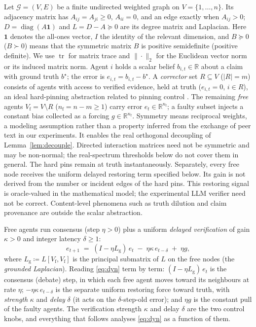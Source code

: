 \documentclass[11pt]{article}
\theoremstyle{definition}
\newcommand{\R}{\mathbb{R}}
\newcommand{\Lg}{L_{\mathrm g}}
\DeclareMathOperator{\diag}{diag}
\DeclareMathOperator{\tr}{tr}
\begin{document}
Let $\mathcal G=(V,E)$ be a finite undirected weighted graph on $V=\{1,\dots,n\}$.
Its adjacency matrix has $A_{ij}=A_{ji}\ge0$, $A_{ii}=0$, and an edge exactly when $A_{ij}>0$;
$D=\diag(A\mathbf1)$ and $L=D-A\succeq0$ are its degree matrix and Laplacian.
Here $\mathbf1$ denotes the all-ones vector, $I$ the identity of the relevant dimension,
and $B\succeq0$ ($B\succ0$) means that the symmetric matrix $B$ is positive semidefinite
(positive definite). We use $\tr$ for matrix trace and $\|\cdot\|_2$ for the Euclidean
vector norm or its induced matrix norm. Agent $i$
holds a scalar belief $b_{i,t}\in\R$ about a claim with ground truth $b^\star$; the error is
$e_{i,t}=b_{i,t}-b^\star$. A \emph{corrector} set $R\subseteq V$ ($|R|=m$) consists of agents with
access to verified evidence, held at truth ($e_{i,t}=0$, $i\in R$), an ideal hard-pinning abstraction related to pinning control
\cite{WangChen}. The remaining \emph{free} agents
$V_{\mathrm f}=V\setminus R$ ($n_{\mathrm f}=n-m\ge1$) carry error $e_t\in\R^{n_{\mathrm f}}$; a faulty
subset injects a constant bias collected as a forcing $g\in\R^{n_{\mathrm f}}$.
Symmetry means reciprocal weights, a modeling assumption rather than a property inferred from
the exchange of peer text in our experiments. It enables the real orthogonal decoupling of
Lemma~\ref{lem:decouple}. Directed interaction matrices need not be symmetric and may be non-normal;
the real-spectrum thresholds below do not cover them in general.
The hard pins remain at truth instantaneously. Separately, every free node receives the uniform
delayed restoring term specified below. Its gain is not derived from the number or incident edges
of the hard pins. This restoring signal is oracle-valued in the mathematical model; the experimental
LLM verifier need not be correct. Content-level phenomena such as truth dilution and claim
provenance are outside the scalar abstraction.

Free agents run consensus (step $\eta>0$) plus a uniform \emph{delayed verification} of gain
$\kappa>0$ and integer latency $\delta\ge1$:
\begin{equation}\label{eq:dyn}
  e_{t+1} \;=\; (I-\eta \Lg)\,e_t \;-\; \eta\kappa\, e_{t-\delta} \;+\; \eta g,
\end{equation}
where $\Lg \coloneqq L[V_{\mathrm f},V_{\mathrm f}]$ is the principal submatrix of $L$ on the free
nodes (the \emph{grounded Laplacian}). Reading \eqref{eq:dyn} term by term: $(I-\eta\Lg)\,e_t$ is the
consensus (debate) step, in which each free agent moves toward its neighbours at rate $\eta$;
$-\eta\kappa\,e_{t-\delta}$ is the separate uniform restoring force toward truth, with \emph{strength}
$\kappa$ and \emph{delay} $\delta$ (it acts on the $\delta$-step-old error); and $\eta g$ is the
constant pull of the faulty agents. The verification strength $\kappa$ and delay $\delta$ are the two
control knobs, and everything that follows analyses \eqref{eq:dyn} as a function of them.
\end{document}

